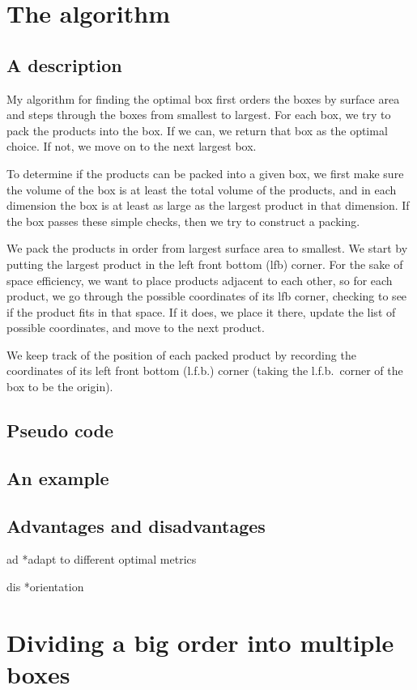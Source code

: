 \documentclass[11pt]{amsart}
\begin{document}
\section*{The algorithm}

\subsection*{A description}

My algorithm for finding the optimal box first orders the boxes by surface area and steps through the boxes from smallest to largest. For each box, we try to pack the products into the box. If we can, we return that box as the optimal choice. If not, we move on to the next largest box.

To determine if the products can be packed into a given box, we first make sure the volume of the box is at least the total volume of the products, and in each dimension the box is at least as large as the largest product in that dimension. If the box passes these simple checks, then we try to construct a packing.

We pack the products in order from largest surface area to smallest. We start by putting the largest product in the left front bottom (lfb) corner. For the sake of space efficiency, we want to place products adjacent to each other, so for each product, we go through the possible coordinates of its lfb corner, checking to see if the product fits in that space. If it does, we place it there, update the list of possible coordinates, and move to the next product.

We keep track of the position of each packed product by recording the coordinates of its left front bottom (l.f.b.) corner (taking the l.f.b.\ corner of the box to be the origin).

\subsection*{Pseudo code}

\begin{figure}[h]
{}
\label{apmd}
\end{figure}

\subsection*{An example}

\subsection*{Advantages and disadvantages}

ad
*adapt to different optimal metrics

dis
*orientation

\section*{Dividing a big order into multiple boxes}
\end{document}
